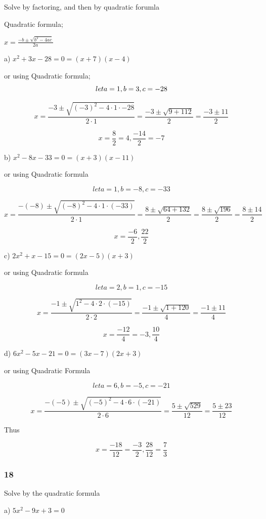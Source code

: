 \documentclass[]{report}
\begin{document}
Solve by factoring, and then by quadratic forumla

Quadratic formula;

$x = \frac{-b \pm \sqrt{b^2 - 4ac}}{2a}$

a) $x^2 + 3x - 28 = 0 = (x + 7)(x - 4)$

or using Quadratic formula;
\[
let a = 1, b = 3, c = -28 \\
\]

\[
x = \frac{-3 \pm \sqrt{(-3)^2 - 4\cdot1\cdot-28}}{2\cdot1} = \frac{-3 \pm \sqrt{9 + 112}}{2} = \frac{-3 \pm 11}{2}
\]

\[
x = \frac{8}{2} = 4 ,  \frac{-14}{2} = -7
\]

b) $x^2 - 8x - 33 = 0 = (x + 3)(x - 11)$

or using Quadratic formula

\[
let a=1, b=-8, c= -33
\]

\[
x = \frac{-(-8) \pm \sqrt{(-8)^2 - 4\cdot1\cdot(-33)}}{2\cdot1} = \frac{8 \pm \sqrt{64  + 132}}{2} = \frac{8 \pm \sqrt{196}}{2} = \frac{8 \pm 14}{2}
\]

\[
x = \frac{-6}{2}, \frac{22}{2}
\]



c) $2x^2 + x -15 = 0 = (2x - 5)(x + 3)$


or  using Quadratic formula

\[
let a=2, b=1, c=-15
\]

\[
x = \frac{-1 \pm \sqrt{1^2 - 4\cdot2\cdot(-15)}}{2\cdot2} = \frac{-1 \pm \sqrt{1 + 120}}{4} = \frac{-1 \pm 11}{4}
\]

\[
x = \frac{-12}{4} = -3, \frac{10}{4}
\]

d) $6x^2 - 5x -21 = 0 = (3x - 7)(2x + 3)$

or using Quadratic Formula

\[
let a=6, b=-5, c=-21
\]

\[
x = \frac{-(-5) \pm \sqrt{(-5)^2 - 4\cdot6\cdot(-21)}}{2\cdot6} = \frac{5 \pm \sqrt{529}}{12} = \frac{5 \pm 23}{12}
\]

Thus

\[
x=\frac{-18}{12} = \frac{-3}{2}, \frac{28}{12} = \frac{7}{3}
\]



\subsubsection{18}

Solve by the quadratic formula

a) $5x^2 - 9x + 3 = 0 $
\end{document}
